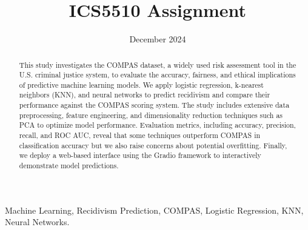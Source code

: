 \documentclass[conference]{IEEEtran}
\begin{document}
	
	\title{ICS5510 Assignment}
	
	\author{
		\date{December 2024}
		
	}
	
	\maketitle
	
	\begin{abstract}
	This study investigates the COMPAS dataset, a widely used risk assessment tool in the U.S. criminal justice system, to evaluate the accuracy, fairness, and ethical implications of predictive machine learning models. We apply logistic regression, k-nearest neighbors (KNN), and neural networks to predict recidivism and compare their performance against the COMPAS scoring system. The study includes extensive data preprocessing, feature engineering, and dimensionality reduction techniques such as PCA to optimize model performance. Evaluation metrics, including accuracy, precision, recall, and ROC AUC, reveal that some techniques outperform COMPAS in classification accuracy but we also raise concerns about potential overfitting. Finally, we deploy a web-based interface using the Gradio framework to interactively demonstrate model predictions. 
	\end{abstract}
	
	\begin{IEEEkeywords}
		 Machine Learning, Recidivism Prediction, COMPAS, Logistic Regression, KNN, Neural Networks.
	\end{IEEEkeywords}
	
	
	
%	
	
%	
	
%	
	
	
	
	
	
	
	
	
	\printbibliography
	
\end{document}

